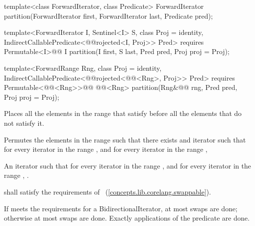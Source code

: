 %
\begin{removedblock}
\begin{itemdecl}
template<class ForwardIterator, class Predicate>
  ForwardIterator
    partition(ForwardIterator first,
              ForwardIterator last, Predicate pred);
\end{itemdecl}
\end{removedblock}
\begin{addedblock}
\begin{itemdecl}
template<ForwardIterator I, Sentinel<I> S, class Proj = identity,
    IndirectCallablePredicate<@@rojected<I, Proj>> Pred>
  requires Permutable<I>@\newtxt{()}@
  I partition(I first, S last, Pred pred, Proj proj = Proj{});

template<ForwardRange Rng, class Proj = identity,
    IndirectCallablePredicate<@@rojected<@@<Rng>, Proj>> Pred>
  requires Permutable<@@<Rng>>@\newtxt{()}@
  @@<Rng>
    partition(Rng&@\newtxt{\&}@ rng, Pred pred, Proj proj = Proj{});
\end{itemdecl}
\end{addedblock}

\begin{itemdescr}
\pnum
\begin{removedblock}
\effects Places all the elements in the range  that satisfy
 before all the elements that do not satisfy it.
\end{removedblock}

\begin{addedblock}
\effects Permutes the elements in the range  such that there exists and iterator 
such that for every iterator  in the range 
, and for every iterator  in the
range , 
\end{addedblock}

\pnum
\returns An iterator  such that for every iterator  in the range 
,
and for every iterator  in the range ,
.

\begin{removedblock}
\pnum
\requires
{} shall satisfy the requirements of
~(\ref{concepts.lib.corelang.swappable}).
\end{removedblock}

\pnum
\complexity If  meets the requirements for a BidirectionalIterator, at most
 swaps are done; otherwise at most  swaps
are done. Exactly  applications of the predicate are done.
\end{itemdescr}

